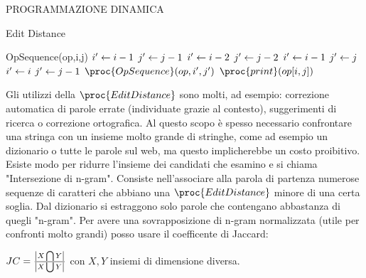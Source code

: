 \documentclass[8pt]{extarticle}
\begin{document}
\begin{formulario}
\begin{myParagraph}{PROGRAMMAZIONE DINAMICA}
\begin{subParagraph}{Edit Distance}
\begin{code}{OpSequence(op,i,j)}
	\li \RETURN
\END
\li {}
	\li $i' \leftarrow i-1$
	\li $j' \leftarrow j-1$
\li {}
	\li $i' \leftarrow i-2$
	\li $j' \leftarrow j-2$
\li {}
	\li $i' \leftarrow i-1$
	\li $j' \leftarrow j$
\li \ELSE {}
	\li $i' \leftarrow i$
	\li $j' \leftarrow j-1$
\END
\li $\proc{OpSequence}(op,i',j')$
\li $\proc{print}(op[i,j])$
			\end{code}
Gli utilizzi della $\proc{EditDistance}$ sono molti, ad esempio: correzione automatica di parole errate (individuate grazie al contesto), suggerimenti di ricerca o correzione ortografica. Al questo scopo è spesso necessario confrontare una stringa con un insieme molto grande di stringhe, come ad esempio un dizionario o tutte le parole sul web, ma questo implicherebbe un costo proibitivo. Esiste modo per ridurre l'insieme dei candidati che esamino e si chiama "Intersezione di n-gram". Consiste nell'associare alla parola di partenza numerose sequenze di caratteri che abbiano una $\proc{EditDistance}$ minore di una certa soglia. Dal dizionario si estraggono solo parole che contengano abbastanza di quegli "n-gram". Per avere una sovrapposizione di n-gram normalizzata (utile per confronti molto grandi) posso usare il coefficente di Jaccard:\\
			\begin{tcenter}
$JC=\frac{\left\vert X\bigcap Y \right\vert}{\left\vert X\bigcup Y \right\vert}$ con $X,Y$ insiemi di dimensione diversa. 
			\end{tcenter}
		\end{subParagraph}
	\end{myParagraph}
	

\end{formulario}
\end{document}
